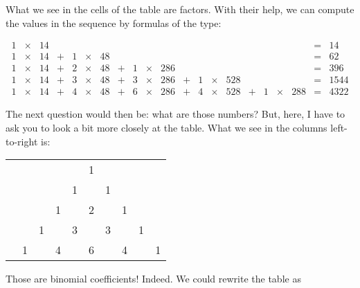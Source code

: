 \documentclass[tikz]{scrreprt}
\begin{document}
What we see in the cells of the table
are factors. With their help, we can compute
the values in the sequence by formulas of the type:

\begin{equation}
\begin{array}{rcrcrcrcrcrcrcrcrcrcr}
  1 & \times & 14 &   &   &        &    &   &   &        &     &   &   &        &     &   &   &        &     & = & 14\\
  1 & \times & 14 & + & 1 & \times & 48 &   &   &        &     &   &   &        &     &   &   &        &     & = & 62\\
  1 & \times & 14 & + & 2 & \times & 48 & + & 1 & \times & 286 &   &   &        &     &   &   &        &     & = & 396\\
  1 & \times & 14 & + & 3 & \times & 48 & + & 3 & \times & 286 & + & 1 & \times & 528 &   &   &        &     & = & 1544\\
  1 & \times & 14 & + & 4 & \times & 48 & + & 6 & \times & 286 & + & 4 & \times & 528 & + & 1 & \times & 288 & = & 4322
\end{array}
\end{equation}

The next question would then be: what are those numbers?
But, here, I have to ask you to look a bit more closely at the table.
What we see in the columns left-to-right is:

\begin{center}
\begin{tabular}{cccccccccc}
  &   &     &    &     & 1 &      &   &   &   \\
  &   &     &    &  1  &   &  1   &   &   &   \\
  &   &     &  1 &     & 2 &      & 1 &   &   \\
  &   &  1  &    &  3  &   &  3   &   & 1 &    \\
  & 1 &     & 4  &     & 6 &      & 4 &   & 1 
\end{tabular}
\end{center}

Those are binomial coefficients!
Indeed. We could rewrite the table as
\end{document}
